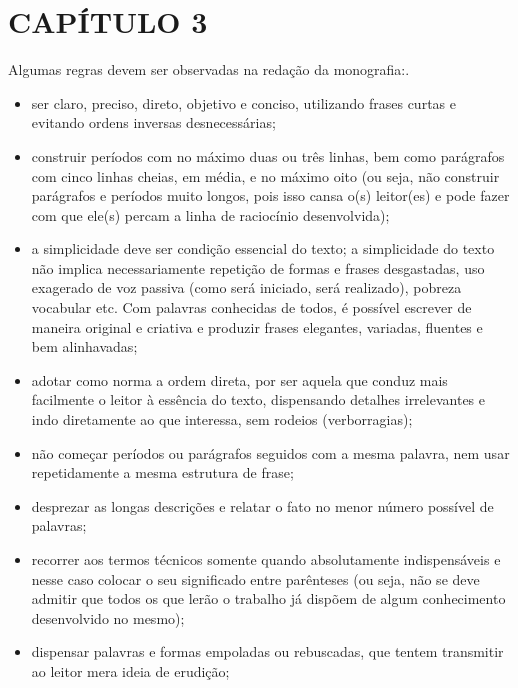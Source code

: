 \chapter{CAPÍTULO 3}
\label{sec:cap3}

Algumas regras devem ser observadas na redação da monografia:.

\begin{itemize}
    \item ser claro, preciso, direto, objetivo e conciso, utilizando frases curtas e evitando ordens inversas desnecessárias;
    
    \item construir períodos com no máximo duas ou três linhas, bem como parágrafos com cinco linhas cheias, em média, e no máximo oito (ou seja, não construir parágrafos e períodos muito longos, pois isso cansa o(s) leitor(es) e pode fazer com que ele(s) percam a linha de raciocínio desenvolvida);
    
    \item a simplicidade deve ser condição essencial do texto; a simplicidade do texto não implica necessariamente repetição de formas e frases desgastadas, uso exagerado de voz passiva (como será iniciado, será realizado), pobreza vocabular etc. Com palavras conhecidas de todos, é possível escrever de maneira original e criativa e produzir frases elegantes, variadas, fluentes e bem alinhavadas;
    
    \item adotar como norma a ordem direta, por ser aquela que conduz mais facilmente o leitor à essência do texto, dispensando detalhes irrelevantes e indo diretamente ao que interessa, sem rodeios (verborragias);

    \item não começar períodos ou parágrafos seguidos com a mesma palavra, nem usar repetidamente a mesma estrutura de frase;

    \item desprezar as longas descrições e relatar o fato no menor número possível de palavras;
    
    \item recorrer aos termos técnicos somente quando absolutamente indispensáveis e nesse caso colocar o seu significado entre parênteses (ou seja, não se deve admitir que todos os que lerão o trabalho já dispõem de algum conhecimento desenvolvido no mesmo);
    
    \item dispensar palavras e formas empoladas ou rebuscadas, que tentem transmitir ao leitor mera ideia de erudição;


\end{itemize}
